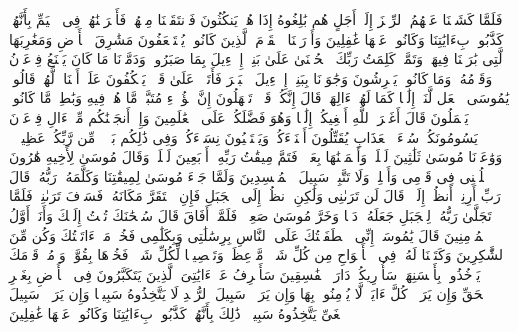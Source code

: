 \stopbuffer
\startbuffer[\q:7:135]
فَلَمَّا كَشَفۡنَا عَنۡهُمُ ٱلرِّجۡزَ إِلَىٰۤ أَجَلٍ هُم بَٰلِغُوهُ إِذَا هُمۡ یَنكُثُونَ%
\stopbuffer
\startbuffer[\q:7:136]
فَٱنتَقَمۡنَا مِنۡهُمۡ فَأَغۡرَقۡنَٰهُمۡ فِی ٱلۡیَمِّ بِأَنَّهُمۡ كَذَّبُوا۟ بِءَایَٰتِنَا وَكَانُوا۟ عَنۡهَا غَٰفِلِینَ%
\stopbuffer
\startbuffer[\q:7:137]
وَأَوۡرَثۡنَا ٱلۡقَوۡمَ ٱلَّذِینَ كَانُوا۟ یُسۡتَضۡعَفُونَ مَشَٰرِقَ ٱلۡأَرۡضِ وَمَغَٰرِبَهَا ٱلَّتِی بَٰرَكۡنَا فِیهَاۖ وَتَمَّتۡ كَلِمَتُ رَبِّكَ ٱلۡحُسۡنَىٰ عَلَىٰ بَنِیۤ إِسۡرَٰۤءِیلَ بِمَا صَبَرُوا۟ۖ وَدَمَّرۡنَا مَا كَانَ یَصۡنَعُ فِرۡعَوۡنُ وَقَوۡمُهُۥ وَمَا كَانُوا۟ یَعۡرِشُونَ%
\stopbuffer
\startbuffer[\q:7:138]
وَجَٰوَزۡنَا بِبَنِیۤ إِسۡرَٰۤءِیلَ ٱلۡبَحۡرَ فَأَتَوۡا۟ عَلَىٰ قَوۡمࣲ یَعۡكُفُونَ عَلَىٰۤ أَصۡنَامࣲ لَّهُمۡۚ قَالُوا۟ یَٰمُوسَى ٱجۡعَل لَّنَاۤ إِلَٰهࣰا كَمَا لَهُمۡ ءَالِهَةࣱۚ قَالَ إِنَّكُمۡ قَوۡمࣱ تَجۡهَلُونَ%
\stopbuffer
\startbuffer[\q:7:139]
إِنَّ هَٰۤؤُلَاۤءِ مُتَبَّرࣱ مَّا هُمۡ فِیهِ وَبَٰطِلࣱ مَّا كَانُوا۟ یَعۡمَلُونَ%
\stopbuffer
\startbuffer[\q:7:140]
قَالَ أَغَیۡرَ ٱللَّهِ أَبۡغِیكُمۡ إِلَٰهࣰا وَهُوَ فَضَّلَكُمۡ عَلَى ٱلۡعَٰلَمِینَ%
\stopbuffer
\startbuffer[\q:7:141]
وَإِذۡ أَنجَیۡنَٰكُم مِّنۡ ءَالِ فِرۡعَوۡنَ یَسُومُونَكُمۡ سُوۤءَ ٱلۡعَذَابِ یُقَتِّلُونَ أَبۡنَاۤءَكُمۡ وَیَسۡتَحۡیُونَ نِسَاۤءَكُمۡۚ وَفِی ذَٰلِكُم بَلَاۤءࣱ مِّن رَّبِّكُمۡ عَظِیمࣱ%
\stopbuffer
\startbuffer[\q:7:142]
۞ وَوَٰعَدۡنَا مُوسَىٰ ثَلَٰثِینَ لَیۡلَةࣰ وَأَتۡمَمۡنَٰهَا بِعَشۡرࣲ فَتَمَّ مِیقَٰتُ رَبِّهِۦۤ أَرۡبَعِینَ لَیۡلَةࣰۚ وَقَالَ مُوسَىٰ لِأَخِیهِ هَٰرُونَ ٱخۡلُفۡنِی فِی قَوۡمِی وَأَصۡلِحۡ وَلَا تَتَّبِعۡ سَبِیلَ ٱلۡمُفۡسِدِینَ%
\stopbuffer
\startbuffer[\q:7:143]
وَلَمَّا جَاۤءَ مُوسَىٰ لِمِیقَٰتِنَا وَكَلَّمَهُۥ رَبُّهُۥ قَالَ رَبِّ أَرِنِیۤ أَنظُرۡ إِلَیۡكَۚ قَالَ لَن تَرَىٰنِی وَلَٰكِنِ ٱنظُرۡ إِلَى ٱلۡجَبَلِ فَإِنِ ٱسۡتَقَرَّ مَكَانَهُۥ فَسَوۡفَ تَرَىٰنِیۚ فَلَمَّا تَجَلَّىٰ رَبُّهُۥ لِلۡجَبَلِ جَعَلَهُۥ دَكࣰّا وَخَرَّ مُوسَىٰ صَعِقࣰاۚ فَلَمَّاۤ أَفَاقَ قَالَ سُبۡحَٰنَكَ تُبۡتُ إِلَیۡكَ وَأَنَا۠ أَوَّلُ ٱلۡمُؤۡمِنِینَ%
\stopbuffer
\startbuffer[\q:7:144]
قَالَ یَٰمُوسَىٰۤ إِنِّی ٱصۡطَفَیۡتُكَ عَلَى ٱلنَّاسِ بِرِسَٰلَٰتِی وَبِكَلَٰمِی فَخُذۡ مَاۤ ءَاتَیۡتُكَ وَكُن مِّنَ ٱلشَّٰكِرِینَ%
\stopbuffer
\startbuffer[\q:7:145]
وَكَتَبۡنَا لَهُۥ فِی ٱلۡأَلۡوَاحِ مِن كُلِّ شَیۡءࣲ مَّوۡعِظَةࣰ وَتَفۡصِیلࣰا لِّكُلِّ شَیۡءࣲ فَخُذۡهَا بِقُوَّةࣲ وَأۡمُرۡ قَوۡمَكَ یَأۡخُذُوا۟ بِأَحۡسَنِهَاۚ سَأُو۟رِیكُمۡ دَارَ ٱلۡفَٰسِقِینَ%
\stopbuffer
\startbuffer[\q:7:146]
سَأَصۡرِفُ عَنۡ ءَایَٰتِیَ ٱلَّذِینَ یَتَكَبَّرُونَ فِی ٱلۡأَرۡضِ بِغَیۡرِ ٱلۡحَقِّ وَإِن یَرَوۡا۟ كُلَّ ءَایَةࣲ لَّا یُؤۡمِنُوا۟ بِهَا وَإِن یَرَوۡا۟ سَبِیلَ ٱلرُّشۡدِ لَا یَتَّخِذُوهُ سَبِیلࣰا وَإِن یَرَوۡا۟ سَبِیلَ ٱلۡغَیِّ یَتَّخِذُوهُ سَبِیلࣰاۚ ذَٰلِكَ بِأَنَّهُمۡ كَذَّبُوا۟ بِءَایَٰتِنَا وَكَانُوا۟ عَنۡهَا غَٰفِلِینَ%
\stopbuffer
